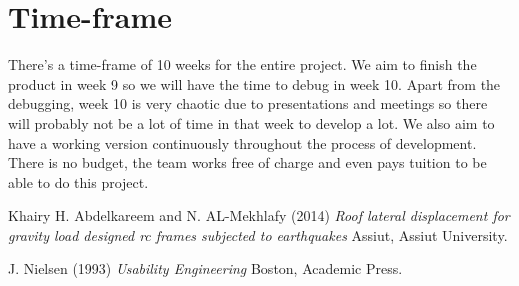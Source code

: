 \documentclass[a4paper]{article}
\begin{document}
\section{Time-frame}
There's a time-frame of 10 weeks for the entire project. We aim to finish the product in week 9 so we will have the time to debug in week 10. Apart from the debugging, week 10 is very chaotic due to presentations and meetings so there will probably not be a lot of time in that week to develop a lot. We also aim to have a working version continuously throughout the process of development. There is no budget, the team works free of charge and even pays tuition to be able to do this project.

\begin{thebibliography}{9}
Khairy H. Abdelkareem and N. AL-Mekhlafy (2014)
\textit{Roof lateral displacement for gravity load designed rc frames subjected to earthquakes} Assiut, Assiut University.

J. Nielsen (1993) 
\textit{Usability Engineering}
Boston, Academic Press.
\end{thebibliography}
\end{document}
